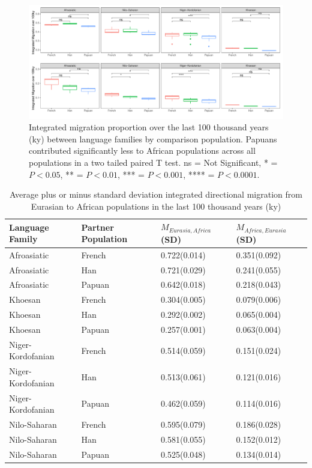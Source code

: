 \documentclass{article}
\begin{document}
\begin{figure}
	\centering
	\includegraphics[width=\textwidth]{../plot/mig/sgdp_averages.pdf}
	\caption{Integrated migration proportion over the last 100 thousand years (ky) between language families by comparison population. Papuans contributed significantly less to African populations across all populations in a two tailed paired T test. ns = Not Significant, * = $P<0.05$, ** = $P<0.01$, *** = $P<0.001$, **** = $P<0.0001$.}
	\label{averages_of_sgdp}
\end{figure}

\begin{table}[ht]
	\centering
	\begin{tabular}{llll}
		\hline
		Language Family & Partner Population & $M_{Eurasia, Africa}$ (SD) & $M_{Africa, Eurasia}$ (SD) \\ 
		\hline
		Afroasiatic & French & 0.722(0.014) & 0.351(0.092) \\ 
		Afroasiatic & Han & 0.721(0.029) & 0.241(0.055) \\ 
		Afroasiatic & Papuan & 0.642(0.018) & 0.218(0.043) \\ 
		Khoesan & French & 0.304(0.005) & 0.079(0.006) \\ 
		Khoesan & Han & 0.292(0.002) & 0.065(0.004) \\ 
		Khoesan & Papuan & 0.257(0.001) & 0.063(0.004) \\ 
		Niger-Kordofanian & French & 0.514(0.059) & 0.151(0.024) \\ 
		Niger-Kordofanian & Han & 0.513(0.061) & 0.121(0.016) \\ 
		Niger-Kordofanian & Papuan & 0.462(0.059) & 0.114(0.016) \\ 
		Nilo-Saharan & French & 0.595(0.079) & 0.186(0.028) \\ 
		Nilo-Saharan & Han & 0.581(0.055) & 0.152(0.012) \\ 
		Nilo-Saharan & Papuan & 0.525(0.048) & 0.134(0.014) \\ 
		\hline
	\end{tabular}
	\caption{Average plus or minus standard deviation integrated directional migration from Eurasian to African populations in the last 100 thousand years (ky)} 
	\label{average_sgdp_migration_table}
\end{table}
\end{document}
